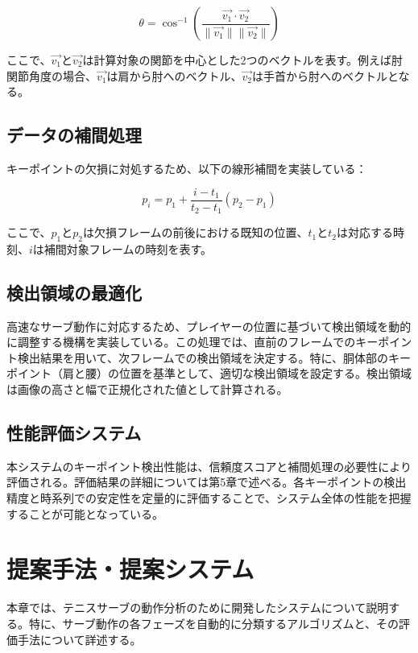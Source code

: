 \documentclass[oneside]{suribt}[11pt]
\begin{document}
\begin{equation}
\theta = \cos^{-1}\left(\frac{\vec{v_1} \cdot \vec{v_2}}{\|\vec{v_1}\| \|\vec{v_2}\|}\right)
\end{equation}

ここで、$\vec{v_1}$と$\vec{v_2}$は計算対象の関節を中心とした2つのベクトルを表す。例えば肘関節角度の場合、$\vec{v_1}$は肩から肘へのベクトル、$\vec{v_2}$は手首から肘へのベクトルとなる。

\section{データの補間処理}
キーポイントの欠損に対処するため、以下の線形補間を実装している\cite{elliott2003}：

\begin{equation}
p_i = p_1 + \frac{i - t_1}{t_2 - t_1}(p_2 - p_1)
\end{equation}

ここで、$p_1$と$p_2$は欠損フレームの前後における既知の位置、$t_1$と$t_2$は対応する時刻、$i$は補間対象フレームの時刻を表す。

\section{検出領域の最適化}
高速なサーブ動作に対応するため、プレイヤーの位置に基づいて検出領域を動的に調整する機構を実装している。この処理では、直前のフレームでのキーポイント検出結果を用いて、次フレームでの検出領域を決定する。特に、胴体部のキーポイント（肩と腰）の位置を基準として、適切な検出領域を設定する。検出領域は画像の高さと幅で正規化された値として計算される。

\section{性能評価システム}
本システムのキーポイント検出性能は、信頼度スコアと補間処理の必要性により評価される。評価結果の詳細については第5章で述べる。各キーポイントの検出精度と時系列での安定性を定量的に評価することで、システム全体の性能を把握することが可能となっている。

\chapter{提案手法・提案システム}

本章では、テニスサーブの動作分析のために開発したシステムについて説明する。特に、サーブ動作の各フェーズを自動的に分類するアルゴリズムと、その評価手法について詳述する。
\end{document}
